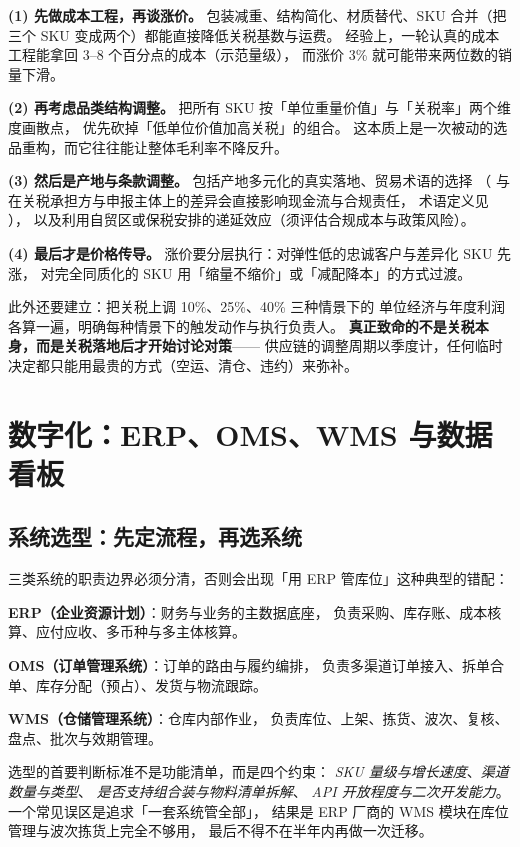 \textbf{(1) 先做成本工程，再谈涨价。}
包装减重、结构简化、材质替代、SKU 合并（把三个 SKU 变成两个）都能直接降低关税基数与运费。
经验上，一轮认真的成本工程能拿回 3--8 个百分点的成本（示范量级），
而涨价 3\% 就可能带来两位数的销量下滑。

\textbf{(2) 再考虑品类结构调整。}
把所有 SKU 按「单位重量价值」与「关税率」两个维度画散点，
优先砍掉「低单位价值加高关税」的组合。
这本质上是一次被动的选品重构，而它往往能让整体毛利率不降反升。

\textbf{(3) 然后是产地与条款调整。}
包括产地多元化的真实落地、贸易术语的选择
（ 与  在关税承担方与申报主体上的差异会直接影响现金流与合规责任，
术语定义见 \cite{incoterms2020}），
以及利用自贸区或保税安排的递延效应（须评估合规成本与政策风险）。

\textbf{(4) 最后才是价格传导。}
涨价要分层执行：对弹性低的忠诚客户与差异化 SKU 先涨，
对完全同质化的 SKU 用「缩量不缩价」或「减配降本」的方式过渡。

此外还要建立：把关税上调 10\%、25\%、40\% 三种情景下的
单位经济与年度利润各算一遍，明确每种情景下的触发动作与执行负责人。
\textbf{真正致命的不是关税本身，而是关税落地后才开始讨论对策}——
供应链的调整周期以季度计，任何临时决定都只能用最贵的方式（空运、清仓、违约）来弥补。

\section{数字化：ERP、OMS、WMS 与数据看板}
\label{sec:sup-digital}

\subsection{系统选型：先定流程，再选系统}

三类系统的职责边界必须分清，否则会出现「用 ERP 管库位」这种典型的错配：

\textbf{ERP（企业资源计划）}：财务与业务的主数据底座，
负责采购、库存账、成本核算、应付应收、多币种与多主体核算。

\textbf{OMS（订单管理系统）}：订单的路由与履约编排，
负责多渠道订单接入、拆单合单、库存分配（预占）、发货与物流跟踪。

\textbf{WMS（仓储管理系统）}：仓库内部作业，
负责库位、上架、拣货、波次、复核、盘点、批次与效期管理。

选型的首要判断标准不是功能清单，而是四个约束：
\emph{SKU 量级与增长速度}、\emph{渠道数量与类型}、
\emph{是否支持组合装与物料清单拆解}、
\emph{API 开放程度与二次开发能力}。
一个常见误区是追求「一套系统管全部」，
结果是 ERP 厂商的 WMS 模块在库位管理与波次拣货上完全不够用，
最后不得不在半年内再做一次迁移。

